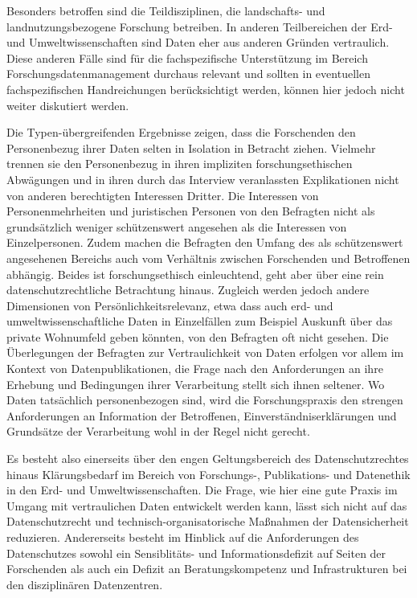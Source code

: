 \documentclass[a4paper,
fontsize=11pt,
oneside,
numbers=noperiodatend,
parskip=half-,
bibliography=totoc,
final
]{scrartcl}
\begin{document}
Besonders betroffen sind die Teildisziplinen, die landschafts- und
landnutzungsbezogene Forschung betreiben. In anderen Teilbereichen der
Erd- und Umweltwissenschaften sind Daten eher aus anderen Gründen
vertraulich. Diese anderen Fälle sind für die fachspezifische
Unterstützung im Bereich Forschungsdatenmanagement durchaus relevant und
sollten in eventuellen fachspezifischen Handreichungen berücksichtigt
werden, können hier jedoch nicht weiter diskutiert werden.

Die Typen-übergreifenden Ergebnisse zeigen, dass die Forschenden den
Personenbezug ihrer Daten selten in Isolation in Betracht ziehen.
Vielmehr trennen sie den Personenbezug in ihren impliziten
forschungsethischen Abwägungen und in ihren durch das Interview
veranlassten Explikationen nicht von anderen berechtigten Interessen
Dritter. Die Interessen von Personenmehrheiten und juristischen Personen
von den Befragten nicht als grundsätzlich weniger schützenswert
angesehen als die Interessen von Einzelpersonen. Zudem machen die
Befragten den Umfang des als schützenswert angesehenen Bereichs auch vom
Verhältnis zwischen Forschenden und Betroffenen abhängig. Beides ist
forschungsethisch einleuchtend, geht aber über eine rein
datenschutzrechtliche Betrachtung hinaus. Zugleich werden jedoch andere
Dimensionen von Persönlichkeitsrelevanz, etwa dass auch erd- und
umweltwissenschaftliche Daten in Einzelfällen zum Beispiel Auskunft über
das private Wohnumfeld geben könnten, von den Befragten oft nicht
gesehen. Die Überlegungen der Befragten zur Vertraulichkeit von Daten
erfolgen vor allem im Kontext von Datenpublikationen, die Frage nach den
Anforderungen an ihre Erhebung und Bedingungen ihrer Verarbeitung stellt
sich ihnen seltener. Wo Daten tatsächlich personenbezogen sind, wird die
Forschungspraxis den strengen Anforderungen an Information der
Betroffenen, Einverständniserklärungen und Grundsätze der Verarbeitung
wohl in der Regel nicht gerecht.

Es besteht also einerseits über den engen Geltungsbereich des
Datenschutzrechtes hinaus Klärungsbedarf im Bereich von Forschungs-,
Publikations- und Datenethik in den Erd- und Umweltwissenschaften. Die
Frage, wie hier eine gute Praxis im Umgang mit vertraulichen Daten
entwickelt werden kann, lässt sich nicht auf das Datenschutzrecht und
technisch-organisatorische Maßnahmen der Datensicherheit reduzieren.
Andererseits besteht im Hinblick auf die Anforderungen des Datenschutzes
sowohl ein Sensiblitäts- und Informationsdefizit auf Seiten der
Forschenden als auch ein Defizit an Beratungskompetenz und
Infrastrukturen bei den disziplinären Datenzentren.
\end{document}
